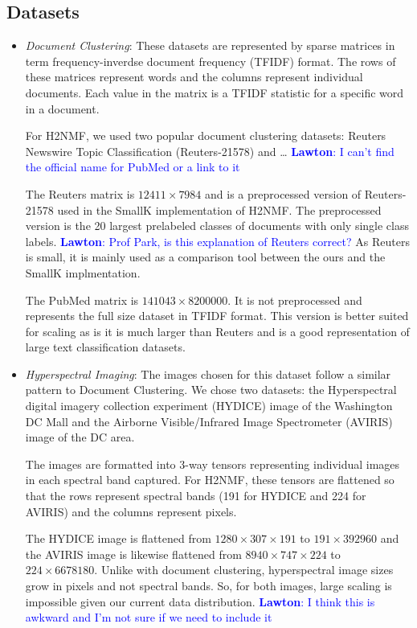 \documentclass[conference,compsoc]{IEEEtran}
\newcommand{\LM}[1]{\textcolor{blue}{\textbf{Lawton}: #1}}
\begin{document}
\subsection{Datasets}

\begin{itemize}
	\item \textit{Document Clustering}:
	These datasets are represented by sparse matrices in term frequency-inverdse document frequency (TFIDF) format.
	The rows of these matrices represent words and the columns represent individual documents. Each value in the matrix is a TFIDF statistic for
	a specific word in a document. 

	For H2NMF, we used two popular document clustering datasets: Reuters Newswire Topic Classification (Reuters-21578) and \dots
	\LM{I can't find the official name for PubMed or a link to it}

	The Reuters matrix is $12411\times 7984$ and is a preprocessed version of Reuters-21578 used in the SmallK implementation of H2NMF.
	The preprocessed version is the 20 largest prelabeled classes of documents with only single class labels. 
	\LM{Prof Park, is this explanation of Reuters correct?}
	As Reuters is small, it is mainly used as a comparison tool between the ours and the SmallK implmentation.

	The PubMed matrix is $141043\times 8200000$. It is not preprocessed and represents the full size dataset in TFIDF format. This version is
	better suited for scaling as is it is much larger than Reuters and is a good representation of large text classification datasets.

	\item \textit{Hyperspectral Imaging}:
	The images chosen for this dataset follow a similar pattern to Document Clustering. We chose two datasets: the Hyperspectral digital imagery
	collection experiment (HYDICE) image of the Washington DC Mall and the Airborne Visible/Infrared Image Spectrometer (AVIRIS) image 
	of the DC area. 

	The images are formatted into 3-way tensors representing individual images in each spectral band captured. For H2NMF, these tensors 
	are flattened so that the rows represent spectral bands (191 for HYDICE and 224 for AVIRIS) and the columns represent pixels.

	The HYDICE image is flattened from $1280\times 307\times 191$ to $191\times 392960$ and the AVIRIS image is likewise
	flattened from $8940\times 747\times 224$ to $224\times 6678180$. Unlike with document clustering, hyperspectral image sizes grow in pixels
	and not spectral bands. So, for both images, large scaling is impossible given our current data distribution.
	\LM{I think this is awkward and I'm not sure if we need to include it}
	


\end{itemize}
\end{document}
